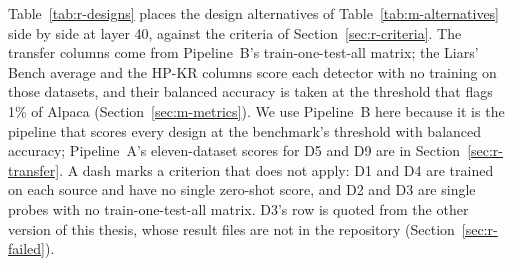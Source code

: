Table~\ref{tab:r-designs} places the design alternatives of Table~\ref{tab:m-alternatives} side by side at layer 40, against the criteria of Section~\ref{sec:r-criteria}.
The transfer columns come from Pipeline~B's train-one-test-all matrix; the Liars' Bench average and the HP-KR columns score each detector with no training on those datasets, and their balanced accuracy is taken at the threshold that flags 1\% of Alpaca (Section~\ref{sec:m-metrics}). %
We use Pipeline~B here because it is the pipeline that scores every design at the benchmark's threshold with balanced accuracy; Pipeline~A's eleven-dataset scores for D5 and D9 are in Section~\ref{sec:r-transfer}. %
A dash marks a criterion that does not apply: D1 and D4 are trained on each source and have no single zero-shot score, and D2 and D3 are single probes with no train-one-test-all matrix. %
D3's row is quoted from the other version of this thesis, whose result files are not in the repository (Section~\ref{sec:r-failed}). %

